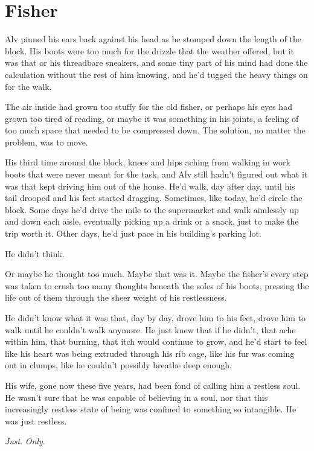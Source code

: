 \hypertarget{fisher}{%
\chapter{Fisher}\label{fisher}}

Alv pinned his ears back against his head as he stomped down the length of the block. His boots were too much for the drizzle that the weather offered, but it was that or his threadbare sneakers, and some tiny part of his mind had done the calculation without the rest of him knowing, and he'd tugged the heavy things on for the walk.

The air inside had grown too stuffy for the old fisher, or perhaps his eyes had grown too tired of reading, or maybe it was something in his joints, a feeling of too much space that needed to be compressed down. The solution, no matter the problem, was to move.

His third time around the block, knees and hips aching from walking in work boots that were never meant for the task, and Alv still hadn't figured out what it was that kept driving him out of the house. He'd walk, day after day, until his tail drooped and his feet started dragging. Sometimes, like today, he'd circle the block. Some days he'd drive the mile to the supermarket and walk aimlessly up and down each aisle, eventually picking up a drink or a snack, just to make the trip worth it. Other days, he'd just pace in his building's parking lot.

He didn't think.

Or maybe he thought too much. Maybe that was it. Maybe the fisher's every step was taken to crush too many thoughts beneath the soles of his boots, pressing the life out of them through the sheer weight of his restlessness.

He didn't know what it was that, day by day, drove him to his feet, drove him to walk until he couldn't walk anymore. He just knew that if he didn't, that ache within him, that burning, that itch would continue to grow, and he'd start to feel like his heart was being extruded through his rib cage, like his fur was coming out in clumps, like he couldn't possibly breathe deep enough.

His wife, gone now these five years, had been fond of calling him a restless soul. He wasn't sure that he was capable of believing in a soul, nor that this increasingly restless state of being was confined to something so intangible. He was just restless.

\emph{Just}. \emph{Only}.

